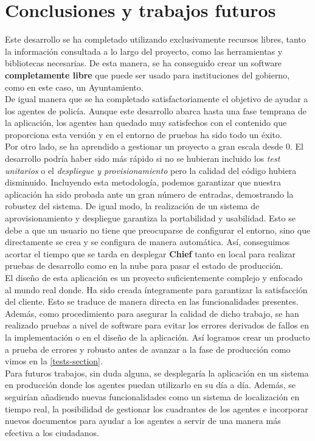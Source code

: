 \chapter{Conclusiones y trabajos futuros}

Este desarrollo se ha completado utilizando exclusivamente recursos libres, tanto la información consultada a lo largo del proyecto, como 
las herramientas y bibliotecas necesarias. De esta manera, se ha conseguido crear un software \textbf{completamente libre} que puede
ser usado para instituciones del gobierno, como en este caso, un Ayuntamiento. \\

De igual manera que se ha completado satisfactoriamente el objetivo de ayudar a los agentes de policía. Aunque este desarrollo abarca hasta 
una fase temprana de la aplicación, los agentes han quedado muy satisfechos con el contenido que proporciona esta versión y en el entorno
de pruebas ha sido todo un éxito.\\

Por otro lado, se ha aprendido a gestionar un proyecto a gran escala desde 0. El desarrollo podría haber sido más rápido si no se hubieran 
incluido los \textit{test unitarios} o el \textit{despliegue y provisionamiento} pero la calidad del código hubiera disminuido. Incluyendo
esta metodología, podemos garantizar que nuestra aplicación ha sido probada ante un gran número de entradas, demostrando la robustez del sistema. 
De igual modo, la realización de un sistema de aprovisionamiento y despliegue garantiza la portabilidad y usabilidad. Esto se debe a que
un usuario no tiene que preocuparse de configurar el entorno, sino que directamente se crea y se configura de manera automática. Así, conseguimos
acortar el tiempo que se tarda en desplegar \textbf{Chief} tanto en local para realizar pruebas de desarrollo como en la nube para pasar el estado de
producción.\\

El diseño de esta aplicación es un proyecto suficientemente complejo y enfocado al mundo real donde. Ha sido creada íntegramente para garantizar la satisfacción del cliente. Esto se traduce de manera directa en las funcionalidades presentes.\\

Además, como procedimiento para asegurar la calidad de dicho trabajo, se han realizado pruebas a nivel de software para evitar los errores derivados de fallos en la implementación o en el diseño de la aplicación. Así logramos crear un producto a prueba de errores y robusto antes de avanzar a la fase de producción como vimos en la \autoref{tests-section}.\\


Para futuros trabajos, sin duda alguna, se desplegaría la aplicación en un sistema en producción donde los agentes puedan utilizarlo en su día
a día. Además, se seguirían añadiendo nuevas funcionalidades como un sistema de localización en tiempo real, la posibilidad de gestionar los cuadrantes de los agentes e incorporar nuevos documentos para ayudar a los agentes a servir de una manera más efectiva a los ciudadanos.
